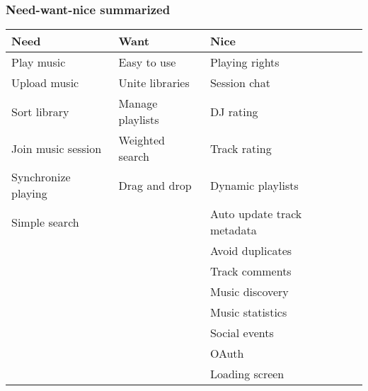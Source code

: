 \subsubsection{Need-want-nice summarized}

\begin{center}
	\begin{tabular}{ | l | l | l | p{5cm} |}
	\hline
	\textbf{Need} & \textbf{Want} & \textbf{Nice} \\ \hline
	Play music & Easy to use & Playing rights \\ \hline
	Upload music & Unite libraries & Session chat \\ \hline
	Sort library & Manage playlists & DJ rating \\ \hline
	Join music session & Weighted search & Track rating \\ \hline
	Synchronize playing & Drag and drop& Dynamic playlists \\ \hline
	Simple search & & Auto update track meta\-data \\ \hline
	 & & Avoid duplicates\\ \hline
	 & & Track comments\\ \hline
	 & & Music discovery\\ \hline
	 & & Music statistics\\ \hline
	 & & Social events\\ \hline
	 & & OAuth \\ \hline
	 & & Loading screen\\ \hline
	\end{tabular}
\end{center}
